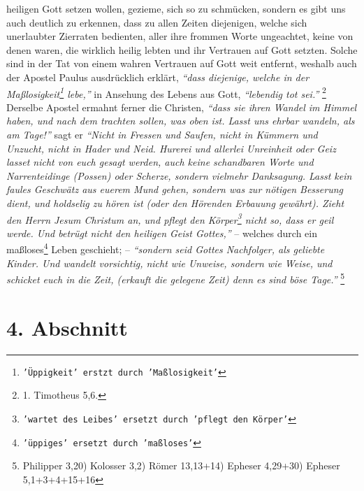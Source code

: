 heiligen Gott setzen wollen, gezieme, sich so zu schmücken, sondern es gibt uns
auch deutlich zu erkennen, dass zu allen Zeiten diejenigen, welche sich
unerlaubter Zierraten bedienten, aller ihre frommen Worte ungeachtet, keine von
denen waren, die wirklich heilig lebten und ihr Vertrauen auf Gott setzten.
Solche sind in der Tat von einem wahren Vertrauen auf Gott weit entfernt,
weshalb auch der Apostel Paulus ausdrücklich erklärt,
\textit{"`dass diejenige, welche
in der Maßlosigkeit\footnote{\texttt{'Üppigkeit' erstzt durch 'Maßlosigkeit'}} lebe,"'} in 
Ansehung des Lebens aus Gott,
\textit{"`lebendig tot sei."'}
\footnote{1. Timotheus 5,6.}
Derselbe Apostel ermahnt ferner die Christen,
\textit{"`dass sie ihren Wandel im Himmel haben, und nach dem trachten sollen, was oben
ist. Lasst uns ehrbar wandeln, als am Tage!"'} sagt er
\textit{"`Nicht in Fressen und
Saufen, nicht in Kümmern und Unzucht, nicht in Hader und Neid. Hurerei und
allerlei Unreinheit oder Geiz lasset nicht von euch gesagt werden, auch keine
schandbaren Worte und Narrenteidinge (Possen) oder Scherze, sondern vielmehr
Danksagung. Lasst kein faules Geschwätz aus euerem Mund gehen, sondern was zur
nötigen Besserung dient, und holdselig zu hören ist (oder den Hörenden
Erbauung gewährt). Zieht den Herrn Jesum Christum an, und pflegt den Körper\footnote{\texttt{'wartet des Leibes' 
ersetzt durch 'pflegt den Körper'}} 
nicht so, dass er geil werde. Und betrügt nicht den heiligen Geist Gottes,"'} --
welches durch ein maßloses\footnote{\texttt{'üppiges' ersetzt durch 'maßloses'}} Leben geschieht; --
\textit{"`sondern seid Gottes Nachfolger,
als geliebte Kinder. Und wandelt vorsichtig, nicht wie Unweise, sondern wie
Weise, und schicket euch in die Zeit, (erkauft die gelegene Zeit) denn es sind
böse Tage."'}
\footnote{Philipper 3,20)  Kolosser 3,2)  Römer 13,13+14) Epheser 4,29+30) Epheser 5,1+3+4+15+16}

\section{4. Abschnitt} \label{kap15_ab4}

